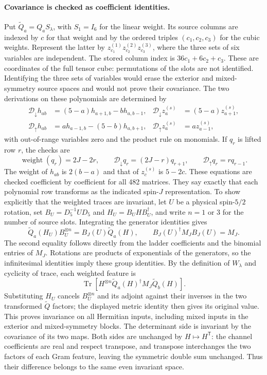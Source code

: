 \documentclass[11pt,a4paper]{article}
\begin{document}
\paragraph{Covariance is checked as coefficient identities.}
Put $\widetilde Q_a=Q_aS_\lambda$, with $S_1=I_6$ for the linear
weight. Its source columns are indexed by $c$ for that weight and by
the ordered triples $(c_1,c_2,c_3)$ for the cubic weights. Represent
the latter by $z^{(1)}_{c_1}z^{(2)}_{c_2}z^{(3)}_{c_3}$, where the
three sets of six variables are independent. The stored column index
is $36c_1+6c_2+c_3$. These are coordinates of the full tensor cube:
permutations of the slots are not identified. Identifying the three
sets of variables would erase the exterior and mixed-symmetry source
spaces and would not prove their covariance.
The two derivations on these polynomials are determined by
\begin{align*}
 \mathcal D_{\downarrow}h_{ab}&=(5-a)h_{a+1,b}-b h_{a,b-1},&
 \mathcal D_{\downarrow}z_a^{(s)}&=(5-a)z_{a+1}^{(s)},\\
 \mathcal D_{\uparrow}h_{ab}&=a h_{a-1,b}-(5-b)h_{a,b+1},&
 \mathcal D_{\uparrow}z_a^{(s)}&=a z_{a-1}^{(s)},
\end{align*}
with out-of-range variables zero and the product rule on monomials.
If $q_r$ is lifted row $r$, the checks are
\[
 \operatorname{weight}(q_r)=2J-2r,\qquad
 \mathcal D_{\downarrow}q_r=(2J-r)q_{r+1},\qquad
 \mathcal D_{\uparrow}q_r=rq_{r-1}.
\]
The weight of $h_{ab}$ is $2(b-a)$ and that of $z_c^{(s)}$ is $5-2c$.
These equations are checked coefficient by coefficient for all 482
matrices. They say exactly that each polynomial row transforms as the
indicated spin-$J$ representation. To show explicitly that the weighted
traces are invariant, let $U$ be a physical spin-$5/2$ rotation, set
$B_U=D_5^{-1}UD_5$ and $H_U=B_UHB_U^\dagger$, and write $n=1$ or $3$
for the number of source slots. Integrating the generator identities
gives
\[
 \widetilde Q_a(H_U)B_U^{\otimes n}=B_J(U)\widetilde Q_a(H),
 \qquad B_J(U)^\dagger M_JB_J(U)=M_J.
\]
The second equality follows directly from the ladder coefficients and
the binomial entries of $M_J$. Rotations are products of exponentials
of the generators, so the infinitesimal identities imply these group
identities. By the definition of $W_\lambda$ and cyclicity of trace,
each weighted feature is
\[
 \operatorname{Tr}\!\left[H^{\otimes n}
 \widetilde Q_a(H)^\dagger M_J\widetilde Q_b(H)\right].
\]
Substituting $H_U$ cancels $B_U^{\otimes n}$ and its adjoint against
their inverses in the two transformed $\widetilde Q$ factors; the
displayed metric identity then gives its original value. This proves
invariance on all Hermitian inputs, including mixed inputs in the
exterior and mixed-symmetry blocks.
The determinant side is invariant by the covariance of its two maps.
Both sides are unchanged by $H\mapsto H^{\mathsf T}$: the channel
coefficients are real and respect transpose, and transpose interchanges
the two factors of each Gram feature, leaving the symmetric double sum
unchanged. Thus their difference belongs to the same even invariant space.
\end{document}
